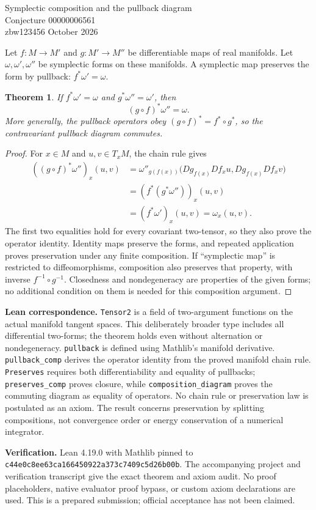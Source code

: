 \documentclass[11pt]{article}
\newtheorem{theorem}{Theorem}
\begin{document}
\begin{center}{\Large Symplectic composition and the pullback diagram}\\[5pt]{\large Conjecture 00000006561}\\[5pt]zbw123456  October 2026\end{center}

Let $f:M\to M'$ and $g:M'\to M''$ be differentiable maps of real manifolds. Let $\omega,\omega',\omega''$ be symplectic forms on these manifolds. A symplectic map preserves the form by pullback: $f^*\omega'=\omega$.
\begin{theorem}
If $f^*\omega'=\omega$ and $g^*\omega''=\omega'$, then
\[
(g\circ f)^*\omega''=\omega.
\]
More generally, the pullback operators obey $(g\circ f)^*=f^*\circ g^*$, so the contravariant pullback diagram commutes.
\end{theorem}
\begin{proof}
For $x\in M$ and $u,v\in T_xM$, the chain rule gives
\begin{align*}
((g\circ f)^*\omega'')_x(u,v)
 &=\omega''_{g(f(x))}\bigl(Dg_{f(x)}Df_xu,Dg_{f(x)}Df_xv\bigr)\\
 &=(f^*(g^*\omega''))_x(u,v)\\
 &=(f^*\omega')_x(u,v)=\omega_x(u,v).
\end{align*}
The first two equalities hold for every covariant two-tensor, so they also prove the operator identity. Identity maps preserve the forms, and repeated application proves preservation under any finite composition. If ``symplectic map'' is restricted to diffeomorphisms, composition also preserves that property, with inverse $f^{-1}\circ g^{-1}$. Closedness and nondegeneracy are properties of the given forms; no additional condition on them is needed for this composition argument.
\end{proof}
\textbf{Lean correspondence.} \texttt{Tensor2} is a field of two-argument functions on the actual manifold tangent spaces. This deliberately broader type includes all differential two-forms; the theorem holds even without alternation or nondegeneracy. \texttt{pullback} is defined using Mathlib's manifold derivative. \texttt{pullback\_comp} derives the operator identity from the proved manifold chain rule. \texttt{Preserves} requires both differentiability and equality of pullbacks; \texttt{preserves\_comp} proves closure, while \texttt{composition\_diagram} proves the commuting diagram as equality of operators. No chain rule or preservation law is postulated as an axiom. The result concerns preservation by splitting compositions, not convergence order or energy conservation of a numerical integrator.


\textbf{Verification.} Lean 4.19.0 with Mathlib pinned to
\texttt{c44e0c8ee63ca166450922a373c7409c5d26b00b}.
The accompanying project and verification transcript give the exact theorem and axiom audit. No proof placeholders, native evaluator proof bypass, or custom axiom declarations are used. This is a prepared submission; official acceptance has not been claimed.
\end{document}
